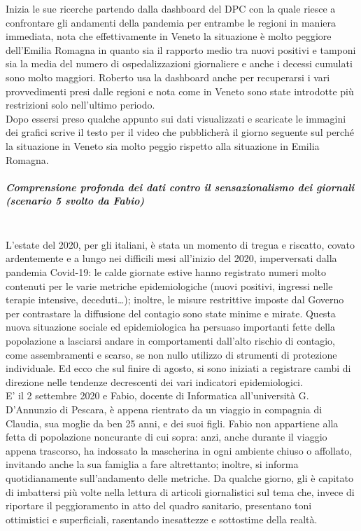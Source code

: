 Inizia le sue ricerche partendo dalla dashboard del DPC con la quale riesce a confrontare gli andamenti della pandemia per entrambe le regioni in maniera immediata, nota che effettivamente in Veneto la situazione è molto peggiore dell'Emilia Romagna in quanto sia il rapporto medio tra nuovi positivi e tamponi sia la media del numero di ospedalizzazioni giornaliere e anche i decessi cumulati sono  molto maggiori.
Roberto usa la dashboard anche per recuperarsi i vari provvedimenti presi dalle regioni e nota come in Veneto sono state introdotte più restrizioni solo nell'ultimo periodo. \\
Dopo essersi preso qualche appunto sui dati visualizzati e scaricate le immagini dei grafici scrive il testo per il video che pubblicherà il giorno seguente sul perché la situazione in Veneto sia molto peggio rispetto alla situazione in Emilia Romagna.
\noindent
\subparagraph{Comprensione profonda dei dati contro il sensazionalismo dei giornali (scenario 5 svolto da Fabio)}\mbox{}\\
L'estate del 2020, per gli italiani, è stata un momento di tregua e riscatto, covato ardentemente e a lungo nei difficili mesi all'inizio del 2020, imperversati dalla pandemia Covid-19: le calde giornate estive hanno registrato numeri molto contenuti per le varie metriche epidemiologiche (nuovi positivi, ingressi nelle terapie intensive, deceduti…); inoltre, le misure restrittive imposte dal Governo per contrastare la diffusione del contagio sono state minime e mirate.
Questa nuova situazione sociale ed epidemiologica ha persuaso importanti fette della popolazione a lasciarsi andare in comportamenti dall'alto rischio di contagio, come assembramenti e scarso, se non nullo utilizzo di strumenti di protezione individuale.
Ed ecco che sul finire di agosto, si sono iniziati a registrare cambi di direzione nelle tendenze decrescenti dei vari indicatori epidemiologici.\\
E' il 2 settembre 2020 e Fabio, docente di Informatica all'università G. D'Annunzio di Pescara, è appena rientrato da un viaggio in compagnia di Claudia, sua moglie da ben 25 anni, e dei suoi figli.
Fabio non appartiene alla fetta di popolazione noncurante di cui sopra: anzi, anche durante il viaggio appena trascorso, ha indossato la mascherina in ogni ambiente chiuso o affollato, invitando anche la sua famiglia a fare altrettanto; inoltre, si informa quotidianamente sull'andamento delle metriche.
Da qualche giorno, gli è capitato di imbattersi più volte nella lettura di articoli giornalistici sul tema che, invece di riportare il peggioramento in atto del quadro sanitario, presentano toni ottimistici e superficiali, rasentando inesattezze e sottostime della realtà.
